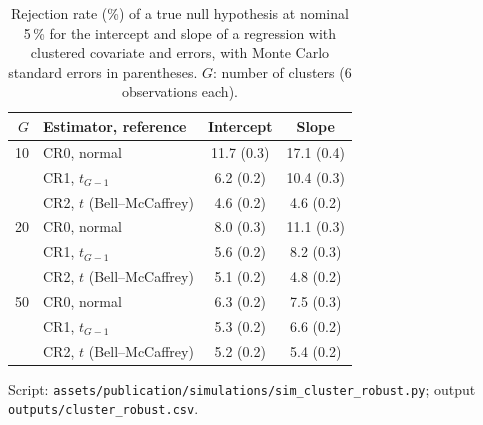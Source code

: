 \begin{table}[htbp]
\centering
\caption{Rejection rate (\%) of a true null hypothesis at nominal 5\,\% for the intercept and slope of a regression with clustered covariate and errors, with Monte Carlo standard errors in parentheses. $G$: number of clusters (6 observations each).}
\label{tab:supp:sim:cluster_robust}
\begin{tabular}{rlcc}
\hline
$G$ & Estimator, reference & Intercept & Slope \\
\hline
10 & CR0, normal                & 11.7 (0.3) & 17.1 (0.4) \\
   & CR1, $t_{G-1}$             & 6.2 (0.2)  & 10.4 (0.3) \\
   & CR2, $t$ (Bell--McCaffrey) & 4.6 (0.2)  & 4.6 (0.2) \\
\hline
20 & CR0, normal                & 8.0 (0.3)  & 11.1 (0.3) \\
   & CR1, $t_{G-1}$             & 5.6 (0.2)  & 8.2 (0.3) \\
   & CR2, $t$ (Bell--McCaffrey) & 5.1 (0.2)  & 4.8 (0.2) \\
\hline
50 & CR0, normal                & 6.3 (0.2)  & 7.5 (0.3) \\
   & CR1, $t_{G-1}$             & 5.3 (0.2)  & 6.6 (0.2) \\
   & CR2, $t$ (Bell--McCaffrey) & 5.2 (0.2)  & 5.4 (0.2) \\
\hline
\end{tabular}
\end{table}

\noindent Script: \texttt{assets/publication/simulations/sim\_cluster\_robust.py}; output \texttt{outputs/cluster\_robust.csv}.

